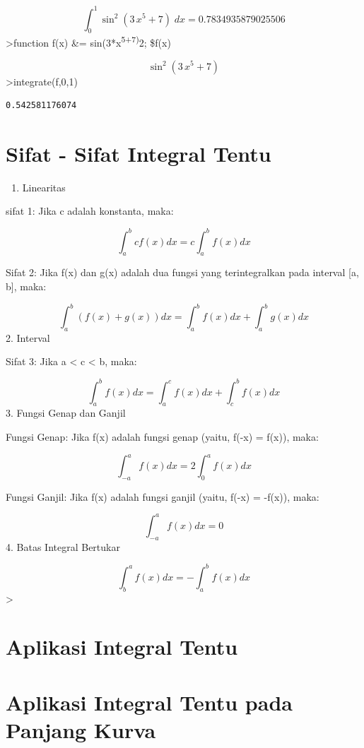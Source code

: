 \documentclass[
]{book}
\providecommand{\tightlist}{%
  \setlength{\itemsep}{0pt}\setlength{\parskip}{0pt}}
\begin{document}
\[\int_{0}^{1}{\sin ^2\left(3\,x^5+7\right)\;dx}=0.7834935879025506\]\textgreater function f(x) \&= sin(3*x\textsuperscript{5+7)}2; \$f(x)

\[\sin ^2\left(3\,x^5+7\right)\]\textgreater integrate(f,0,1)

\begin{verbatim}
0.542581176074
\end{verbatim}

\section{Sifat - Sifat Integral Tentu}\label{sifat---sifat-integral-tentu}

\begin{enumerate}
\def\labelenumi{\arabic{enumi}.}
\tightlist
\item
  Linearitas
\end{enumerate}

sifat 1: Jika c adalah konstanta, maka:

\[\int_a^b c f(x) dx = c \int_a^b f(x) dx\]

Sifat 2: Jika f(x) dan g(x) adalah dua fungsi yang terintegralkan pada interval {[}a, b{]}, maka:

\[\int_a^b (f(x) + g(x)) dx = \int_a^b f(x) dx + \int_a^b g(x) dx\]2. Interval

Sifat 3: Jika a \textless{} c \textless{} b, maka:

\[\int_a^b f(x) dx = \int_a^c f(x) dx + \int_c^b f(x) dx\]3. Fungsi Genap dan Ganjil

Fungsi Genap: Jika f(x) adalah fungsi genap (yaitu, f(-x) = f(x)), maka:

\[\int_{-a}^a f(x) dx = 2 \int_0^a f(x) dx\]

Fungsi Ganjil: Jika f(x) adalah fungsi ganjil (yaitu, f(-x) = -f(x)), maka:

\[\int_{-a}^a f(x) dx = 0\]4. Batas Integral Bertukar

\[\int_b^a f(x) dx = -\int_a^b f(x) dx\]\textgreater{}

\section{Aplikasi Integral Tentu}\label{aplikasi-integral-tentu}

\section{Aplikasi Integral Tentu pada Panjang Kurva}\label{aplikasi-integral-tentu-pada-panjang-kurva}
\end{document}
